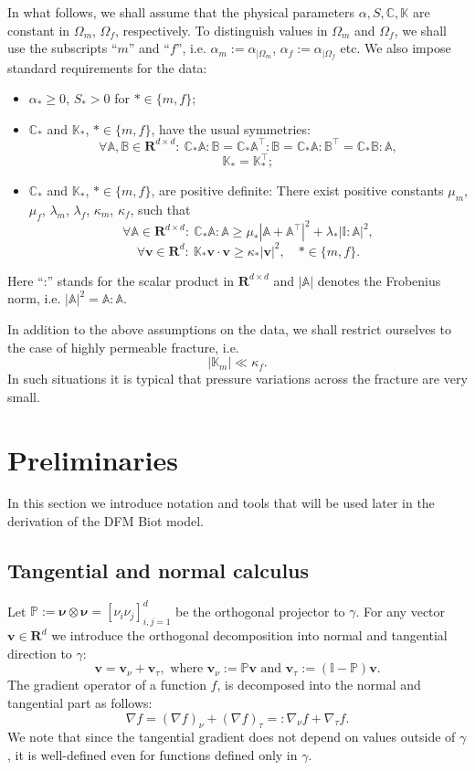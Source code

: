 \documentclass[a4paper]{article}
\numberwithin{equation}{section}
\def\CC{\tn C}
\def\nnu{\boldsymbol\nu}
\def\Real{{\mathbf R}} %
\def\tn#1{{\mathbb{#1}}}    %
\def\vc#1{\mathbf{#1}}     %
\def\vv{\vc v}
\newcommand{\eq}[1]{\begin{equation}#1\end{equation}}
\newcommand{\eqs}[1]{\begin{equation*}#1\end{equation*}}
\begin{document}
In what follows, we shall assume that the physical parameters $\alpha,S,\CC,\tn K$ are constant in $\Omega_m$, $\Omega_f$, respectively.
To distinguish values in $\Omega_m$ and $\Omega_f$, we shall use the subscripts ``$m$'' and ``$f$'', i.e. $\alpha_m := \alpha_{|\Omega_m}$, $\alpha_f := \alpha_{|\Omega_f}$ etc.
We also impose standard requirements for the data:
\begin{itemize}
\item $\alpha_*\ge 0$, $S_*>0$ for $*\in\{m,f\}$;
\item $\CC_*$ and $\tn K_*$, $*\in\{m,f\}$, have the usual symmetries:
\eqs{ \forall \tn A,\tn B\in\Real^{d\times d}:~ \CC_*\tn A:\tn B=\CC_*\tn A^\top:\tn B=\CC_*\tn A:\tn B^\top=\CC_*\tn B:\tn A, }
\eqs{ \tn K_* = \tn K_*^\top; }
\item $\CC_*$ and $\tn K_*$, $*\in\{m,f\}$, are positive definite: %
There exist positive constants $\mu_m$, $\mu_f$, $\lambda_m$, $\lambda_f$, $\kappa_m$, $\kappa_f$, such that
\eq{ \label{eq:pos_def_C_gen} \forall\tn A\in\Real^{d\times d}:~\CC_*\tn A:\tn A \ge \mu_*\left|\tn A+\tn A^\top\right|^2 + \lambda_*|\tn I:\tn A|^2, }
\eq{ \label{eq:pos_def_K} \forall\vv\in\Real^d:~\tn K_*\vv\cdot\vv \ge \kappa_*|\vv|^2,\quad *\in\{m,f\}. }
\end{itemize}
Here ``:'' stands for the scalar product in $\Real^{d\times d}$ and $|\tn A|$ denotes the Frobenius norm, i.e. $|\tn A|^2=\tn A:\tn A$.

In addition to the above assumptions on the data, we shall restrict ourselves to the case of highly permeable fracture, i.e.
\eq{\label{eq:asm_permeable_frac} |\tn K_m|\ll \kappa_f. }
In such situations it is typical that pressure variations across the fracture are very small.


\section{Preliminaries}\label{sec:calculus}

In this section we introduce notation and tools that will be used later in the derivation of the DFM Biot model.

\subsection{Tangential and normal calculus}
Let $\tn P := \nnu\otimes\nnu = [\nu_i\nu_j]_{i,j=1}^d$ be the orthogonal projector to $\gamma$.
For any vector $\vv\in\Real^d$ we introduce the orthogonal decomposition into normal and tangential direction to $\gamma$:
\eqs{ \vv = \vv_\nu + \vv_\tau, \mbox{ where } \vv_\nu := \tn P\vv \mbox{ and } \vv_\tau := (\tn I-\tn P)\vv. }
The gradient operator of a function $f$, is decomposed into the normal and tangential part as follows:
\eqs{ \nabla f = (\nabla f)_\nu + (\nabla f)_\tau =: \nabla_\nu f + \nabla_\tau f. }
We note that since the tangential gradient does not depend on values outside of $\gamma$, it is well-defined even for functions defined only in $\gamma$.
\end{document}
